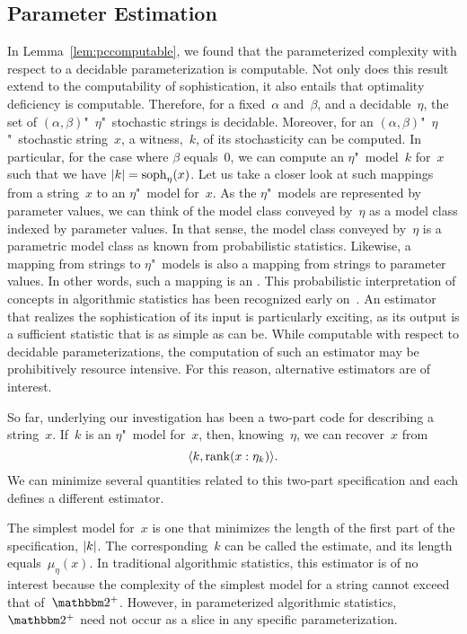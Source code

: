 \subsection{Parameter Estimation}
\label{sec:statistics:estimation}%
In Lemma~\ref{lem:pccomputable}, we found that the parameterized complexity with respect to a decidable parameterization is computable.
Not only does this result extend to the computability of sophistication, it also entails that optimality deficiency is computable.
Therefore, for a fixed~$\alpha$ and~$\beta$, and a decidable~$\eta$, the set of $(\alpha, \beta)$"~$\eta$"~stochastic strings is decidable.
Moreover, for an $(\alpha, \beta)$"~$\eta$"~stochastic string~$x$, a witness,~$k$, of its stochasticity can be computed.
In particular, for the case where $\beta$ equals~$0$, we can compute an $\eta$"~model~$k$ for~$x$ such that we have ${\lvert k\rvert} = \operatorname{soph}_\eta(x)$.
Let us take a closer look at such mappings from a string~$x$ to an $\eta$"~model for~$x$.
As the $\eta$"~models are represented by parameter values, we can think of the model class conveyed by~$\eta$ as a model class indexed by parameter values.
In that sense, the model class conveyed by~$\eta$ is a parametric model class as known from probabilistic statistics.
Likewise, a mapping from strings to $\eta$"~models is also a mapping from strings to parameter values.
In other words, such a mapping is an .
This probabilistic interpretation of concepts in algorithmic statistics has been recognized early on~\parencite{rissanen1983universal,vitanyi2000minimum,gacs2001algorithmic}.
An estimator that realizes the sophistication of its input is particularly exciting, as its output is a sufficient statistic that is as simple as can be.
While computable with respect to decidable parameterizations, the computation of such an estimator may be prohibitively resource intensive.
For this reason, alternative estimators are of interest.

So far, underlying our investigation has been a two-part code for describing a string~$x$.
If~$k$ is an $\eta$"~model for~$x$, then, knowing~$\eta$, we can recover~$x$ from
\begin{equation}
\label{eq:two-part}
  {\langle k, \operatorname{rank}(x : \eta_k)\rangle}.
\end{equation}
We can minimize several quantities related to this two-part specification and each defines a different estimator.

The simplest model for~$x$ is one that minimizes the length of the first part of the specification, ${\lvert k\rvert}$.
The corresponding~$k$ can be called the  estimate, and its length equals~$\mu_\eta(x)$.
In traditional algorithmic statistics, this estimator is of no interest because the complexity of the simplest model for a string cannot exceed that of~$\binary^+$.
However, in parameterized algorithmic statistics, $\binary^+$ need not occur as a slice in any specific parameterization.

